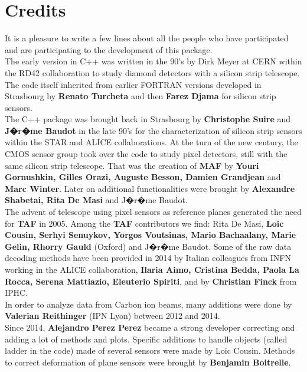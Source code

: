 \documentclass[a4paper, 12pt, twoside]{article}
\newcommand{\TAF}{{\bf TAF }}
\newcommand{\MAF}{{\bf MAF }}
\begin{document}
\newpage

\section{Credits}
\label{secCredits}

It is a pleasure to write a few lines about all the people who have participated and are participating to the development of this package.\\
The early version in C++ was written in the 90's by Dirk Meyer at CERN within the RD42 collaboration to study diamond detectors with a silicon strip telescope. The code itself inherited from earlier FORTRAN versions developed in Strasbourg by {\bf Renato Turcheta} and then {\bf Farez Djama} for silicon strip sensors.\\

The C++ package was brought back in Strasbourg by {\bf Christophe Suire} and {\bf J�r�me Baudot} in the late 90's for the characterization of silicon strip sensors within the STAR and ALICE collaborations. At the turn of the new century, the CMOS sensor group took over the code to study pixel detectors, still with the same silicon strip telescope. That was the creation of \MAF  by {\bf Youri Gornushkin, Gilles Orazi, Auguste Besson, Damien Grandjean} and {\bf Marc Winter}. Later on additional functionalities were brought by {\bf Alexandre Shabetai, Rita De Masi} and J�r�me Baudot.\\

The advent of telescope using pixel sensors as reference planes generated the need for \TAF  in 2005. Among the \TAF  contributors we find: Rita De Masi, {\bf Loic Cousin, Serhyi Senuykov, Yorgos Voutsinas, Mario Bachaalany, Marie Gelin, Rhorry Gauld} (Oxford) and J�r�me Baudot. Some of the raw data decoding methods have been provided in 2014 by Italian colleagues from INFN working in the ALICE collaboration, {\bf Ilaria Aimo, Cristina Bedda, Paola La Rocca, Serena Mattiazio, Eleuterio Spiriti},  and by {\bf Christian Finck} from IPHC.\\
In order to analyze data from Carbon ion beams, many additions were done by {\bf Valerian Reithinger} (IPN Lyon) between 2012 and 2014.\\
Since 2014, {\bf Alejandro Perez Perez} became a strong developer correcting and adding a lot of methods and plots. Specific additions to handle objects (called ladder in the code) made of several sensors were made by Loic Cousin. Methods to correct deformation of plane sensors were brought by {\bf Benjamin Boitrelle}.\\
\end{document}
